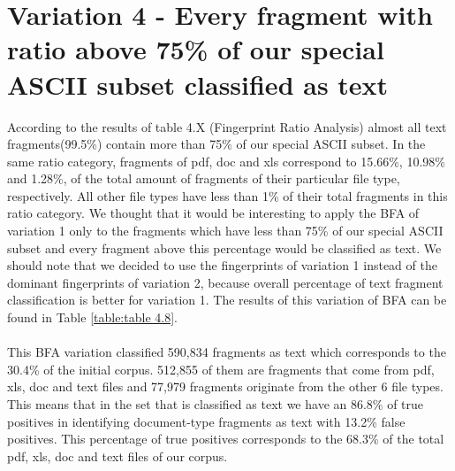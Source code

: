 \section{Variation 4 - Every fragment with ratio above 75\% of our special ASCII subset classified as text } 
According to the results of table 4.X (Fingerprint Ratio Analysis) almost all text fragments(99.5\%) contain more than 75\% of our special ASCII subset. In the same ratio category, fragments of pdf, doc and xls correspond to 15.66\%, 10.98\% and 1.28\%, of the total amount of fragments of their particular file type, respectively. All other file types have less than 1\% of their total fragments in this ratio category. We thought that it would be interesting to apply the BFA of variation 1 only to the fragments which have less than 75\% of our special ASCII subset and every fragment above this percentage would be classified as text. We should note that we decided to use the fingerprints of variation 1 instead of the dominant fingerprints of variation 2, because overall percentage of text fragment classification is better for variation 1. 
 The results of this variation of BFA can be found in Table \ref{table:table 4.8}.\\\\
  This BFA variation classified 590,834 fragments as text which corresponds to the 30.4\% of the initial corpus. 512,855 of them are fragments that come from pdf, xls, doc and text files and 77,979 fragments originate from the other 6 file types. This means that in the set that is classified as text we have an 86.8\% of true positives in identifying document-type fragments as text with 13.2\% false positives. This percentage of true positives corresponds to the 68.3\% of the total pdf, xls, doc and text files of our corpus.
  

